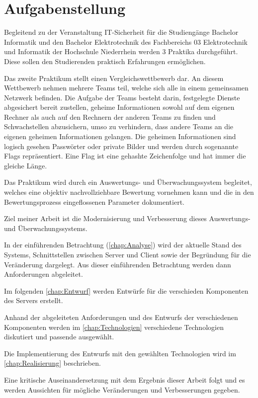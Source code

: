 \section{Aufgabenstellung}
\label{sec:Aufgabenstellung}
Begleitend zu der Veranstaltung IT-Sicherheit für die Studiengänge Bachelor Informatik und den Bachelor Elektrotechnik des Fachbereichs 03 Elektrotechnik und Informatik der Hochschule Niederrhein werden 3 Praktika durchgeführt. Diese sollen den Studierenden praktisch Erfahrungen ermöglichen.

Das zweite Praktikum  stellt einen Vergleichswettbewerb dar. An diesem Wettbewerb nehmen mehrere Teams teil, welche sich alle in einem gemeinsamen Netzwerk befinden. Die Aufgabe der Teams besteht darin, festgelegte Dienste abgesichert bereit zustellen, geheime Informationen sowohl auf dem eigenen Rechner als auch auf den Rechnern der anderen Teams zu finden und Schwachstellen abzusichern, umso zu verhindern, dass andere Teams an die eigenen geheimen Informationen gelangen.\cite[S. 2]{sosnaKonzeptionUndRealisierung2010} Die geheimen Informationen sind logisch gesehen Passwörter oder private Bilder und werden durch sogenannte Flags repräsentiert. Eine Flag ist eine gehashte Zeichenfolge und hat immer die gleiche Länge.

Das Praktikum wird durch ein Auswertungs- und Überwachungssystem begleitet, welches eine objektiv nachvollziehbare Bewertung vornehmen kann und die in den Bewertungsprozess eingeflossenen Parameter dokumentiert.\cite[S. 2]{sosnaKonzeptionUndRealisierung2010}

Ziel meiner Arbeit ist die Modernisierung und Verbesserung dieses Auswertungs- und Überwachungssystems.

In der einführenden Betrachtung (\autoref{chap:Analyse}) wird der aktuelle Stand des Systems, Schnittstellen zwischen Server und Client sowie der Begründung für die Veränderung dargelegt. Aus dieser einführenden Betrachtung werden dann Anforderungen abgeleitet.

Im folgenden \autoref{chap:Entwurf} werden Entwürfe für die verschieden Komponenten des Servers erstellt. 

Anhand der abgeleiteten Anforderungen und des Entwurfs der verschiedenen Komponenten werden im \autoref{chap:Technologien} verschiedene Technologien diskutiert und passende ausgewählt.

Die Implementierung des Entwurfs mit den gewählten Technologien wird im \autoref{chap:Realisierung} beschrieben.

Eine kritische Auseinandersetzung mit dem Ergebnis dieser Arbeit folgt und es werden Aussichten für mögliche Veränderungen und Verbesserungen gegeben.